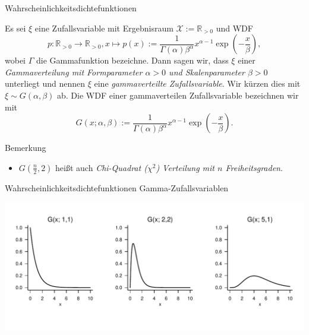 \documentclass[
  8pt,
  ignorenonframetext,
]{beamer}
\begin{document}
\begin{frame}{Wahrscheinlichkeitsdichtefunktionen}
\protect\hypertarget{wahrscheinlichkeitsdichtefunktionen-3}{}
\small
\begin{definition}
\justifying
Es sei $\xi$ eine Zufallsvariable mit Ergebnisraum $\mathcal{X} := \mathbb{R}_{>0}$ und WDF
\begin{equation}
p : \mathbb{R}_{>0} \to \mathbb{R}_{>0},  x \mapsto p(x) :=
\frac{1}{\Gamma(\alpha)\beta^{\alpha}}x^{\alpha-1}\exp\left(-\frac{x}{\beta}\right),
\end{equation}
wobei $\Gamma$ die Gammafunktion bezeichne. Dann sagen wir, dass $\xi$ einer
\textit{Gammaverteilung mit Formparameter $\alpha >0$ und Skalenparameter $\beta > 0$}
unterliegt und nennen $\xi$ eine \textit{gammaverteilte Zufallsvariable}. Wir kürzen
dies mit $\xi \sim G(\alpha,\beta)$ ab. Die WDF einer gammaverteilen Zufallsvariable
bezeichnen wir mit
\begin{equation}
G(x;\alpha,\beta) := \frac{1}{\Gamma(\alpha)\beta^{\alpha}}x^{\alpha-1}\exp\left(-\frac{x}{\beta}\right).
\end{equation}
\end{definition}

Bemerkung

\begin{itemize}
\item $G\left(\frac{n}{2},2\right)$ heißt auch \textit{Chi-Quadrat ($\chi^2$) Verteilung mit $n$ Freiheitsgraden}.
\end{itemize}
\end{frame}

\begin{frame}{Wahrscheinlichkeitsdichtefunktionen}
\protect\hypertarget{wahrscheinlichkeitsdichtefunktionen-4}{}
Gamma-Zufallsvariablen \vspace{1cm}

\begin{center}\includegraphics[width=1\linewidth]{4_Abbildungen/wtfi_4_gammaverteilung_wdf} \end{center}
\end{frame}
\end{document}
